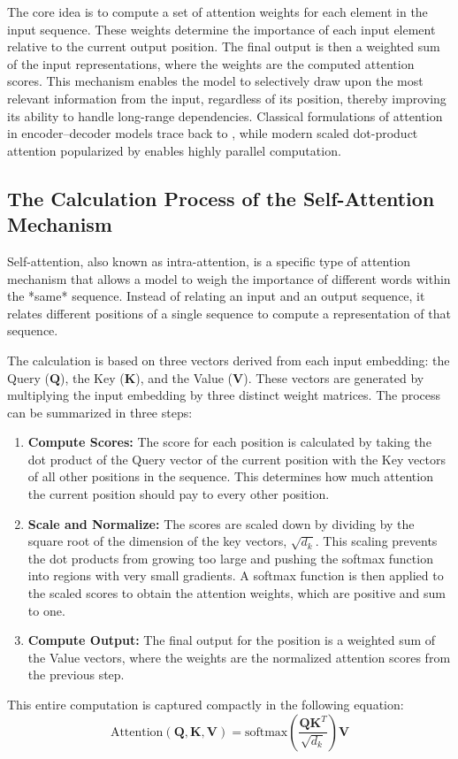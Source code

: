 The core idea is to compute a set of attention weights for each element in the input sequence. These weights determine the importance of each input element relative to the current output position. The final output is then a weighted sum of the input representations, where the weights are the computed attention scores. This mechanism enables the model to selectively draw upon the most relevant information from the input, regardless of its position, thereby improving its ability to handle long-range dependencies.
Classical formulations of attention in encoder–decoder models trace back to \citet{bahdanau2015neural}, while modern scaled dot-product attention popularized by \citet{vaswani2017attention} enables highly parallel computation.

\subsection{The Calculation Process of the Self-Attention Mechanism}
Self-attention, also known as intra-attention, is a specific type of attention mechanism that allows a model to weigh the importance of different words within the *same* sequence. Instead of relating an input and an output sequence, it relates different positions of a single sequence to compute a representation of that sequence.

The calculation is based on three vectors derived from each input embedding: the Query (\(\mathbf{Q}\)), the Key (\(\mathbf{K}\)), and the Value (\(\mathbf{V}\)). These vectors are generated by multiplying the input embedding by three distinct weight matrices.
The process can be summarized in three steps:
\begin{enumerate}
    \item \textbf{Compute Scores:} The score for each position is calculated by taking the dot product of the Query vector of the current position with the Key vectors of all other positions in the sequence. This determines how much attention the current position should pay to every other position.
    \item \textbf{Scale and Normalize:} The scores are scaled down by dividing by the square root of the dimension of the key vectors, \(\sqrt{d_k}\). This scaling prevents the dot products from growing too large and pushing the softmax function into regions with very small gradients. A softmax function is then applied to the scaled scores to obtain the attention weights, which are positive and sum to one.
    \item \textbf{Compute Output:} The final output for the position is a weighted sum of the Value vectors, where the weights are the normalized attention scores from the previous step.
\end{enumerate}
This entire computation is captured compactly in the following equation:
\begin{equation}
    \text{Attention}(\mathbf{Q}, \mathbf{K}, \mathbf{V}) = \text{softmax}\left(\frac{\mathbf{Q}\mathbf{K}^T}{\sqrt{d_k}}\right)\mathbf{V}
    \label{eq:self_attention}
\end{equation}

